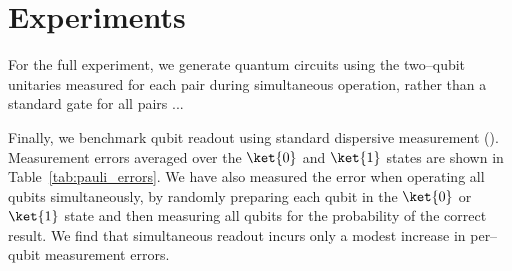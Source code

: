 \section{Experiments}
\label{sec:experiments}
For the full experiment, we generate quantum circuits using the two--qubit
unitaries measured for each pair during simultaneous operation, rather than a
standard gate for all pairs ...

Finally, we benchmark qubit readout using standard dispersive measurement
(\cite{wallraff2005approaching}). Measurement errors averaged over the $\ket{0}$
and $\ket{1}$ states are shown in Table~\ref{tab:pauli_errors}. We have also
measured the error when operating all qubits simultaneously, by randomly
preparing each qubit in the $\ket{0}$ or $\ket{1}$ state and then measuring all
qubits for the probability of the correct result. We find that simultaneous
readout incurs only a modest increase in per--qubit measurement errors.

